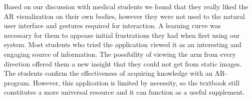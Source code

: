 Based on our discussion with medical students we found that they really liked the AR visualization on their own bodies, however they were not used to the natural user interface and gestures required for interaction. A learning curve was necessary for them to appease initial frustrations they had when first using our system.
Most students who tried the application viewed it as an interesting and engaging source of information. The possibility of viewing the arm from every direction offered them a new insight that they could not get from static images. The students confirm the effectiveness of acquiring knowledge with an AR-program. However, this application is limited by necessity, so the textbook still constitutes a more universal resource and it can function as a useful supplement. 

